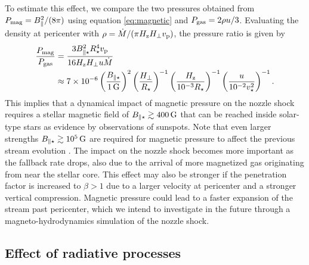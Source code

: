 \documentclass[a4paper,fleqn,usenatbib]{mnras}
\newcommand{\be}{\begin{equation}}
\newcommand{\ee}{\end{equation}}
\newcommand{\rstar}{R_{\star}}
\newcommand{\mdot}{\dot{M}}
\def\gauss{\, \rm G}
\begin{document}
To estimate this effect, we compare the two pressures obtained from $P_{\rm mag} = B^2_{\parallel}/(8 \pi)$ using equation \eqref{eq:magnetic} and $P_{\rm gas} = 2 \rho u /3$. Evaluating the density at pericenter with $\rho = \mdot / (\pi H_{\rm z} H_{\perp} v_{\rm p} )$, the pressure ratio is given by
\be
\begin{split}
\frac{P_{\rm mag}}{P_{\rm gas}} & = \frac{3 B^2_{\parallel \star} \rstar^4 v_{\rm p}}{16 H_{\rm z} H_{\perp} u \mdot} \\
& \approx 7 \times 10^{-6} \left( \frac{B_{\parallel \star}}{1 \gauss} \right)^2 \left( \frac{H_{\perp}}{\rstar} \right)^{-1} \left( \frac{H_{\rm z}}{10^{-3} \rstar} \right)^{-1}  \left( \frac{u}{10^{-2} v^2_{\star}} \right)^{-1}.
\end{split}
\ee
This implies that a dynamical impact of magnetic pressure on the nozzle shock requires a stellar magnetic field of $B_{\parallel \star} \gtrsim 400 \gauss$ that can be reached inside solar-type stars as evidence by observations of sunspots. Note that even larger strengths $B_{\parallel \star} \gtrsim 10^5 \gauss$ are required for magnetic pressure to affect the previous stream evolution \citep{guillochon2017-magnetic,bonnerot2017-magnetic}. The impact on the nozzle shock becomes more important as the fallback rate drops, also due to the arrival of more magnetized gas originating from near the stellar core. This effect may also be stronger if the penetration factor is increased to $\beta>1$ due to a larger velocity at pericenter and a stronger vertical compression. Magnetic pressure could lead to a faster expansion of the stream past pericenter, which we intend to investigate in the future through a magneto-hydrodynamics simulation of the nozzle shock.
 



\subsection{Effect of radiative processes}

\label{sec:radiative}
\end{document}
